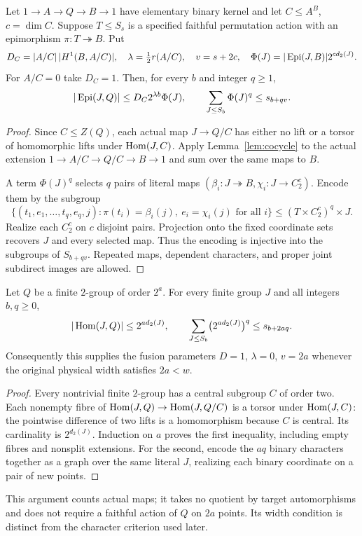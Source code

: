 \begin{proposition}\label{prop:prefix}
Let $1\to A\to Q\to B\to1$ have elementary binary kernel and let
$C\leq A^B$, $c=\dim C$. Suppose $T\leq S_s$ is a specified faithful
permutation action with an epimorphism $\pi:T\twoheadrightarrow B$. Put
\[
 D_C=|A/C|\,|H^1(B,A/C)|,\quad
 \lambda=\tfrac12r(A/C),\quad v=s+2c,\quad
 \Phi(J)=|\operatorname{Epi}(J,B)|2^{c d_2(J)}.
\]
For $A/C=0$ take $D_C=1$. Then, for every $b$ and integer $q\geq1$,
\begin{equation}\label{eq:prefix}
 |\operatorname{Epi}(J,Q)|\leq D_C2^{\lambda b}\Phi(J),\qquad
 \sum_{J\leq S_b}\Phi(J)^q\leq s_{b+qv}.
\end{equation}
\end{proposition}
\begin{proof}
Since $C\leq Z(Q)$, each actual map $J\to Q/C$ has either no lift
or a torsor of homomorphic lifts under $\operatorname{Hom}(J,C)$. Apply
Lemma~\ref{lem:cocycle} to the actual extension
$1\to A/C\to Q/C\to B\to1$ and sum over the same maps to $B$.

A term $\Phi(J)^q$ selects $q$ pairs of literal maps
$(\beta_i:J\twoheadrightarrow B,\chi_i:J\to C_2^c)$.
Encode them by the subgroup
\[
 \{(t_1,e_1,\ldots,t_q,e_q,j):
    \pi(t_i)=\beta_i(j),\ e_i=\chi_i(j)\text{ for all }i\}
       \leq(T\times C_2^c)^q\times J.
\]
Realize each $C_2^c$ on $c$ disjoint pairs. Projection onto the fixed
coordinate sets recovers $J$ and every selected map. Thus the encoding
is injective into the subgroups of $S_{b+qv}$. Repeated maps, dependent
characters, and proper joint subdirect images are allowed.
\end{proof}

\begin{proposition}\label{prop:target-order-fusion}
Let $Q$ be a finite $2$-group of order $2^a$. For every finite group
$J$ and all integers $b,q\geq0$,
\[
 |\operatorname{Hom}(J,Q)|\leq2^{a d_2(J)},\qquad
 \sum_{J\leq S_b}\bigl(2^{a d_2(J)}\bigr)^q\leq s_{b+2aq}.
\]
Consequently this supplies the fusion parameters
$D=1$, $\lambda=0$, $v=2a$ whenever the original physical width
satisfies $2a<w$.
\end{proposition}
\begin{proof}
Every nontrivial finite $2$-group has a central subgroup $C$ of
order two. Each nonempty fibre of
$\operatorname{Hom}(J,Q)\to\operatorname{Hom}(J,Q/C)$ is a torsor under $\operatorname{Hom}(J,C)$:
the pointwise difference of two lifts is a homomorphism because
$C$ is central. Its cardinality is $2^{d_2(J)}$.
Induction on $a$ proves the first inequality, including empty fibres
and nonsplit extensions. For the second, encode the $aq$ binary
characters together as a graph over the same literal $J$, realizing
each binary coordinate on a pair of new points.
\end{proof}
This argument counts actual maps; it takes no quotient by target
automorphisms and does not require a faithful action of $Q$ on $2a$
points. Its width condition is distinct from the character criterion
used later.

